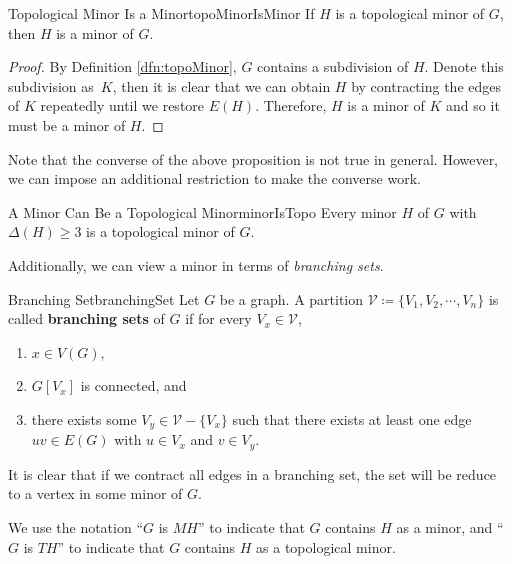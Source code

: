 \documentclass[math]{amznotes}
\theoremstyle{remark}
\begin{document}
\begin{probox}{Topological Minor Is a Minor}{topoMinorIsMinor}
    If $H$ is a topological minor of $G$, then $H$ is a minor of $G$.
    \tcblower
    \begin{proof}
        By Definition \ref{dfn:topoMinor}, $G$ contains a subdivision of $H$. Denote this subdivision as~$K$, then it is clear that we can obtain $H$ by contracting the edges of $K$ repeatedly until we restore $E(H)$. Therefore, $H$ is a minor of $K$ and so it must be a minor of $H$.
    \end{proof}
\end{probox}
Note that the converse of the above proposition is not true in general. However, we can impose an additional restriction to make the converse work.
\begin{probox}{A Minor Can Be a Topological Minor}{minorIsTopo}
    Every minor $H$ of $G$ with $\Delta(H) \geq 3$ is a topological minor of $G$.
\end{probox}
Additionally, we can view a minor in terms of \textit{branching sets}.
\begin{dfnbox}{Branching Set}{branchingSet}
    Let $G$ be a graph. A partition $\mathcal{V} \coloneqq \{V_1, V_2, \cdots, V_n\}$ is called {\color{red} \textbf{branching sets}} of $G$ if for every $V_x \in \mathcal{V}$,
    \begin{enumerate}
        \item $x \in V(G)$,
        \item $G[V_x]$ is connected, and
        \item there exists some $V_y \in \mathcal{V} - \{V_x\}$ such that there exists at least one edge $uv \in E(G)$ with $u \in V_x$ and $v \in V_y$.
    \end{enumerate}
\end{dfnbox}
It is clear that if we contract all edges in a branching set, the set will be reduce to a vertex in some minor of $G$. 

We use the notation ``$G$ is $MH$'' to indicate that $G$ contains $H$ as a minor, and ``$G$ is $TH$'' to indicate that $G$ contains $H$ as a topological minor.
\end{document}

